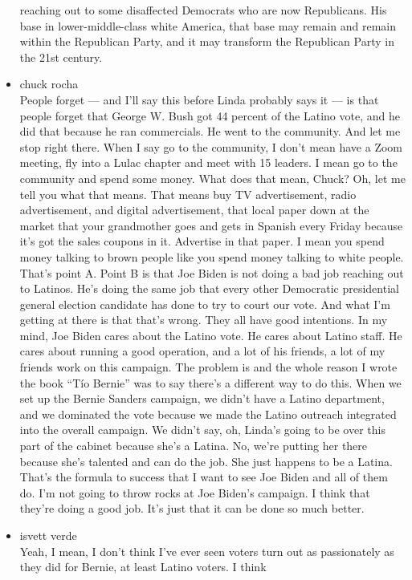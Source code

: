 \begin{itemize}
  reaching out to some disaffected Democrats who are now Republicans.
  His base in lower-middle-class white America, that base may remain and
  remain within the Republican Party, and it may transform the
  Republican Party in the 21st century.
\item
  chuck rocha\\
  People forget --- and I'll say this before Linda probably says it ---
  is that people forget that George W. Bush got 44 percent of the Latino
  vote, and he did that because he ran commercials. He went to the
  community. And let me stop right there. When I say go to the
  community, I don't mean have a Zoom meeting, fly into a Lulac chapter
  and meet with 15 leaders. I mean go to the community and spend some
  money. What does that mean, Chuck? Oh, let me tell you what that
  means. That means buy TV advertisement, radio advertisement, and
  digital advertisement, that local paper down at the market that your
  grandmother goes and gets in Spanish every Friday because it's got the
  sales coupons in it. Advertise in that paper. I mean you spend money
  talking to brown people like you spend money talking to white people.
  That's point A. Point B is that Joe Biden is not doing a bad job
  reaching out to Latinos. He's doing the same job that every other
  Democratic presidential general election candidate has done to try to
  court our vote. And what I'm getting at there is that that's wrong.
  They all have good intentions. In my mind, Joe Biden cares about the
  Latino vote. He cares about Latino staff. He cares about running a
  good operation, and a lot of his friends, a lot of my friends work on
  this campaign. The problem is and the whole reason I wrote the book
  ``Tío Bernie'' was to say there's a different way to do this. When we
  set up the Bernie Sanders campaign, we didn't have a Latino
  department, and we dominated the vote because we made the Latino
  outreach integrated into the overall campaign. We didn't say, oh,
  Linda's going to be over this part of the cabinet because she's a
  Latina. No, we're putting her there because she's talented and can do
  the job. She just happens to be a Latina. That's the formula to
  success that I want to see Joe Biden and all of them do. I'm not going
  to throw rocks at Joe Biden's campaign. I think that they're doing a
  good job. It's just that it can be done so much better.
\item
  isvett verde\\
  Yeah, I mean, I don't think I've ever seen voters turn out as
  passionately as they did for Bernie, at least Latino voters. I think

\end{itemize}
